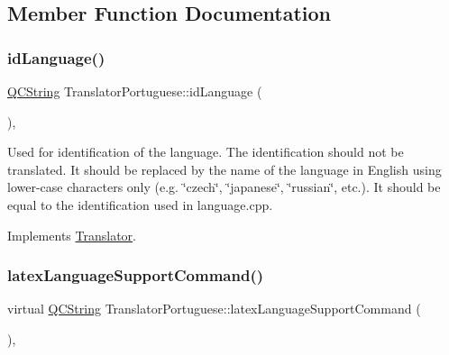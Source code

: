 \subsection{Member Function Documentation}
\mbox{\label{class_translator_portuguese_abc1436faf18f09df7579a53e537fc56a}} 
\subsubsection{\texorpdfstring{idLanguage()}{idLanguage()}}
{\footnotesize\ttfamily \mbox{\hyperlink{class_q_c_string}{Q\+C\+String}} Translator\+Portuguese\+::id\+Language (\begin{DoxyParamCaption}{ }\end{DoxyParamCaption})\hspace{0.3cm}{\ttfamily [inline]}, {\ttfamily [virtual]}}

Used for identification of the language. The identification should not be translated. It should be replaced by the name of the language in English using lower-\/case characters only (e.\+g. \char`\"{}czech\char`\"{}, \char`\"{}japanese\char`\"{}, \char`\"{}russian\char`\"{}, etc.). It should be equal to the identification used in language.\+cpp. 

Implements \mbox{\hyperlink{class_translator}{Translator}}.

\mbox{\label{class_translator_portuguese_a1396ca92359aa49347ab1ac381acebb3}} 
\subsubsection{\texorpdfstring{latexLanguageSupportCommand()}{latexLanguageSupportCommand()}}
{\footnotesize\ttfamily virtual \mbox{\hyperlink{class_q_c_string}{Q\+C\+String}} Translator\+Portuguese\+::latex\+Language\+Support\+Command (\begin{DoxyParamCaption}{ }\end{DoxyParamCaption})\hspace{0.3cm}{\ttfamily [inline]}, {\ttfamily [virtual]}}

